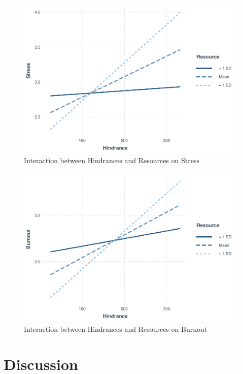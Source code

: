 \documentclass[
  man]{apa7}
\begin{document}
\begin{figure}
\centering
\includegraphics{Submission_files/figure-latex/hind-resource-stress-int-1.pdf}
\caption{\label{fig:hind-resource-stress-int}Interaction between Hindrances and Resources on Stress}
\end{figure}

\begin{figure}
\centering
\includegraphics{Submission_files/figure-latex/hind-resource-burn-int-1.pdf}
\caption{\label{fig:hind-resource-burn-int}Interaction between Hindrances and Resources on Burnout}
\end{figure}

\hypertarget{discussion}{%
\section{Discussion}\label{discussion}}
\end{document}
